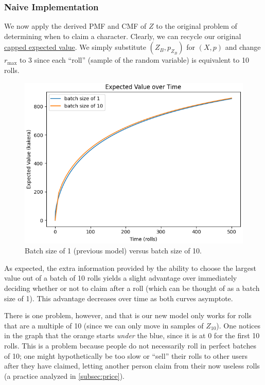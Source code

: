 \documentclass[11pt, oneside]{article}
\theoremstyle{plain}
\theoremstyle{definition}
\begin{document}
\subsubsection{Naive Implementation}
We now apply the derived PMF and CMF of \( Z \) to the original problem of
determining when to claim a character. Clearly, we can recycle our original
\hyperref[alg:capped]{capped expected value}. We simply substitute \( (Z_B,
p_{Z_B}) \) for \( (X, p) \) and change \( r_{\text{max}} \) to 3 since each
\enquote{roll} (sample of the random variable) is equivalent to 10 rolls.
\begin{figure}
  \centering
  \includegraphics[scale=0.5]{graphs/expected_value/model_10}
  \caption{Batch size of 1 (previous model) versus batch size of 10.}
  \label{fig:batch}
\end{figure}

As expected, the extra information provided by the ability to choose the
largest value out of a batch of 10 rolls yields a slight advantage over
immediately deciding whether or not to claim after a roll (which can be
thought of as a batch size of 1). This advantage decreases over time as
both curves asymptote.

There is one problem, however, and that is our new model only works for rolls
that are a multiple of 10 (since we can only move in samples of \( Z_{10}
\)). One notices in the graph that the orange starts \textit{under} the blue,
since it is at 0 for the first 10 rolls. This is a problem because people do
not necessarily roll in perfect batches of 10; one might hypothetically be too
slow or \enquote{sell} their rolls to other users after they have claimed,
letting another person claim from their now useless rolls (a practice analyzed
in \autoref{subsec:price}).
\end{document}
